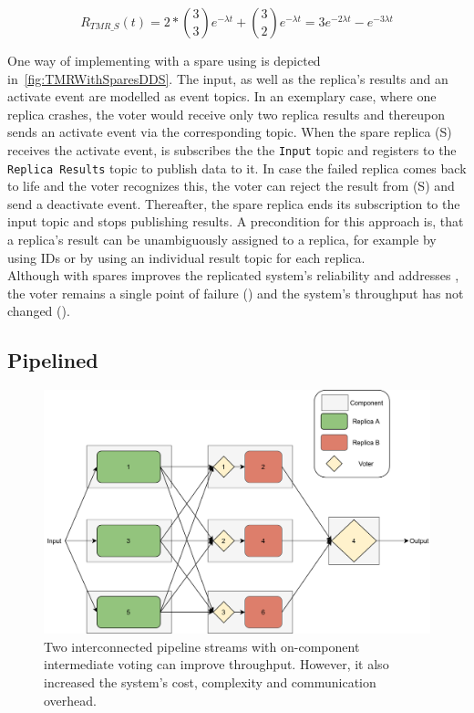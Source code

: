 \begin{equation}
R_{TMR\_S}(t) = 2 * {3 \choose 3} e^{-\lambda t} + {3 \choose 2} e^{-\lambda t}
 = 3e^{-2 \lambda t} - e^{-3 \lambda t}
\end{equation}

One way of implementing  with a spare using  is depicted in~\autoref{fig:TMRWithSparesDDS}.
The input, as well as the replica's results and an activate event are modelled as  event topics.
In an exemplary case, where one replica crashes, the voter would receive only two replica results and thereupon sends an activate event via the corresponding topic.
When the spare replica (S) receives the activate event, is subscribes the the \texttt{Input} topic and registers to the \texttt{Replica Results} topic to publish data to it.
In case the failed replica comes back to life and the voter recognizes this, the voter can reject the result from (S) and send a deactivate event.
Thereafter, the spare replica ends its subscription to the input topic and stops publishing results.
A precondition for this approach is, that a replica's result can be unambiguously assigned to a replica, for example by using IDs or by using an individual result topic for each replica. 
\\

Although  with spares improves the replicated system's reliability and addresses \ChallengeWR, the voter remains a single point of failure (\ChallengeVoter) and the system's throughput has not changed (\ChallengeThrough).

\subsection{Pipelined }
\begin{figure}[!hb]
	\centering
	\includegraphics[width=0.75\linewidth]{images/InterconnectedVoterPipeline}
	\caption{Two interconnected pipeline streams with on-component intermediate voting can improve throughput. However, it also increased the system's cost, complexity and communication overhead.}
	\label{fig:PipelineIntermediateVoters}
\end{figure}

